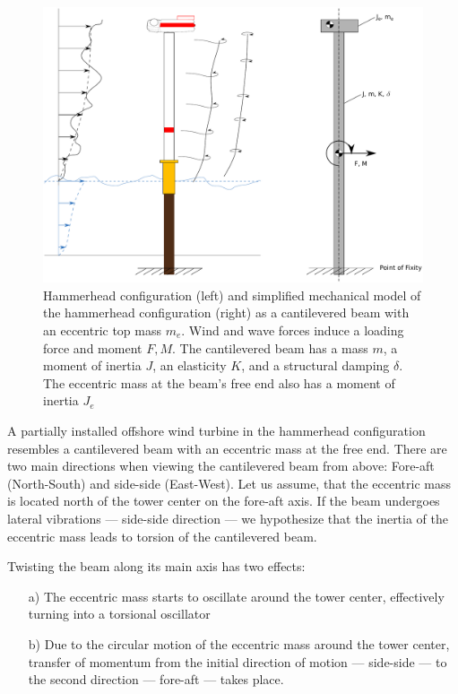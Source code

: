 \documentclass{article}
\begin{document}
\begin{figure}[ht!]
    \centering
    \includegraphics[width=0.7\linewidth]{figures/loading_3.pdf}
    \caption{Hammerhead configuration (left) and simplified mechanical model of the hammerhead configuration (right) as a cantilevered beam with an eccentric top mass $m_e$. Wind and wave forces induce a loading force and moment $F, M$. The cantilevered beam has a mass $m$, a moment of inertia $J$, an elasticity $K$, and a structural damping $\delta$. The eccentric mass at the beam's free end also has a moment of inertia $J_e$ }
    \label{fig:loading}
\end{figure}

A partially installed offshore wind turbine in the hammerhead configuration resembles a cantilevered beam with an eccentric mass at the free end. There are two main directions when viewing the cantilevered beam from above: Fore-aft (North-South) and side-side (East-West). Let us assume, that the eccentric mass is located north of the tower center on the fore-aft axis. If the beam undergoes lateral vibrations — side-side direction — we hypothesize that the inertia of the eccentric mass leads to torsion of the cantilevered beam.

\clearpage

Twisting the beam along its main axis has two effects: 

\begin{itemize}
    \item[a)] The eccentric mass starts to oscillate around the tower center, effectively turning into a torsional oscillator
    
    \item[b)] Due to the circular motion of the eccentric mass around the tower center, transfer of momentum from the initial direction of motion — side-side — to the second direction — fore-aft — takes place.
\end{itemize}
\end{document}
